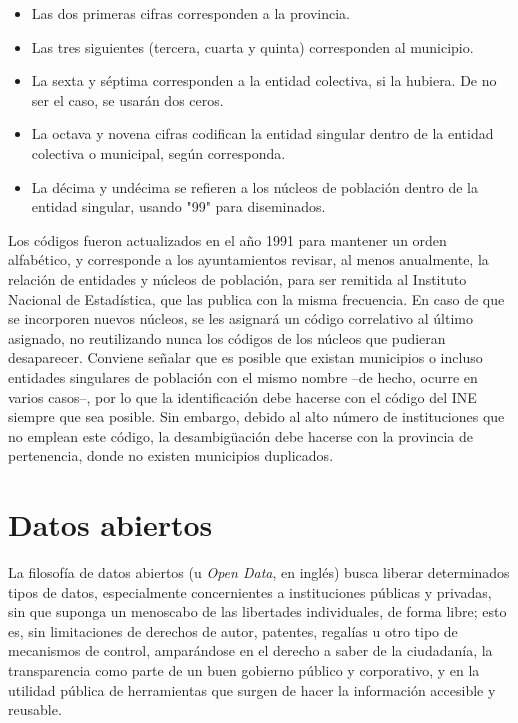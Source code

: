 \begin{itemize}
    \item Las dos primeras cifras corresponden a la provincia.
    \item Las tres siguientes (tercera, cuarta y quinta) corresponden al municipio.
    \item La sexta y séptima corresponden a la entidad colectiva, si la hubiera. De no ser el caso, se usarán dos ceros.
    \item La octava y novena cifras codifican la entidad singular dentro de la entidad colectiva o municipal, según corresponda.
    \item La décima y undécima se refieren a los núcleos de población dentro de la entidad singular, usando "99" para diseminados.
\end{itemize}

Los códigos fueron actualizados en el año 1991 para mantener un orden alfabético, y corresponde a los ayuntamientos revisar, al menos anualmente, la relación de entidades y núcleos de población, para ser remitida al Instituto Nacional de Estadística, que las publica con la misma frecuencia. En caso de que se incorporen nuevos núcleos, se les asignará un código correlativo al último asignado, no reutilizando nunca los códigos de los núcleos que pudieran desaparecer. Conviene señalar que es posible que existan municipios o incluso entidades singulares de población con el mismo nombre –de hecho, ocurre en varios casos–, por lo que la identificación debe hacerse con el código del INE siempre que sea posible. Sin embargo, debido al alto número de instituciones que no emplean este código, la desambigüación debe hacerse con la provincia de pertenencia, donde no existen municipios duplicados.

\section{Datos abiertos}

La filosofía de datos abiertos (u \textit{Open Data}, en inglés) busca liberar determinados tipos de datos, especialmente concernientes a instituciones públicas y privadas, sin que suponga un menoscabo de las libertades individuales, de forma libre; esto es, sin limitaciones de derechos de autor, patentes, regalías u otro tipo de mecanismos de control, amparándose en el derecho a saber de la ciudadanía, la transparencia como parte de un buen gobierno público y corporativo, y en la utilidad pública de herramientas que surgen de hacer la información accesible y reusable. \cite{datos_abiertos}

